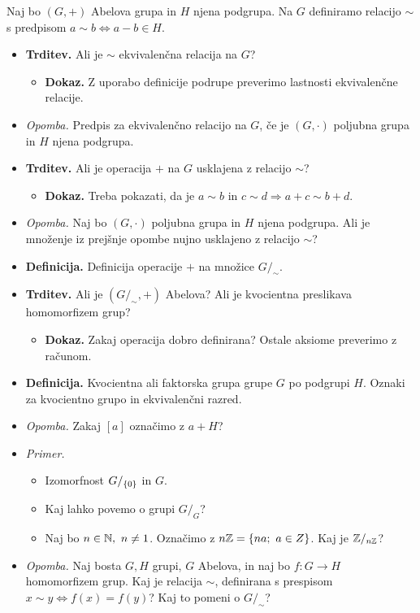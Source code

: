 \begin{enumerate}
    Naj bo $(G,+)$ Abelova grupa in $H$ njena podgrupa. Na $G$ definiramo relacijo $\sim$ s predpisom $a \sim b \Leftrightarrow a - b \in H$.
    \begin{itemize}
        \item \colorbox{blue!30}{\textbf{Trditev.}} Ali je $\sim$ ekvivalenčna relacija na $G$?
        \begin{itemize}
            \item \colorbox{green!30}{\textbf{Dokaz.}} Z uporabo definicije podrupe preverimo lastnosti ekvivalenčne relacije.
        \end{itemize}
        \item \colorbox{yellow!30}{\emph{Opomba.}} Predpis za ekvivalenčno relacijo na $G$, če je $(G, \cdot)$ poljubna grupa in $H$ njena podgrupa.  
        \item \colorbox{blue!30}{\textbf{Trditev.}} Ali je operacija $+$ na $G$ usklajena z relacijo $\sim$?
        \begin{itemize}
            \item \colorbox{green!30}{\textbf{Dokaz.}} Treba pokazati, da je $a \sim b \text{ in } c \sim d \Rightarrow a + c \sim b + d$.
        \end{itemize}
        \item \colorbox{yellow!30}{\emph{Opomba.}} Naj bo $(G, \cdot)$ poljubna grupa in $H$ njena podgrupa. Ali je množenje iz prejšnje opombe nujno usklajeno z relacijo $\sim$?
        \item \colorbox{purple!30}{\textbf{Definicija.}} Definicija operacije $+$ na množice $G/_\sim$.
        \item \colorbox{blue!30}{\textbf{Trditev.}} Ali je $(G/_\sim, +)$ Abelova? Ali je kvocientna preslikava homomorfizem grup?
        \begin{itemize}
            \item \colorbox{green!30}{\textbf{Dokaz.}} Zakaj operacija dobro definirana? Ostale aksiome preverimo z računom.
        \end{itemize}
        \item \colorbox{purple!30}{\textbf{Definicija.}} Kvocientna ali faktorska grupa grupe $G$ po podgrupi $H$. Oznaki za kvocientno grupo in ekvivalenčni razred.
        \item \colorbox{yellow!30}{\emph{Opomba.}} Zakaj $[a]$ označimo z $a+H$?
        \item \colorbox{yellow!30}{\emph{Primer.}}
        \begin{itemize}
            \item Izomorfnost $G/_{\left\{0\right\}}$ in $G$.
            \item Kaj lahko povemo o grupi $G/_G$?
            \item Naj bo $n \in \mathbb{N}, \ n \neq 1$. Označimo z $n\mathbb{Z} = \left\{na; \ a \in Z\right\}$. Kaj je $\mathbb{Z}/_{n\mathbb{Z}}$?
        \end{itemize}
        \item \colorbox{yellow!30}{\emph{Opomba.}} Naj bosta $G, H$ grupi, $G$ Abelova, in naj bo $f: G \to H$ homomorfizem grup. Kaj je relacija $\sim$, definirana s prespisom $x \sim y \Leftrightarrow f(x) = f(y)$? Kaj to pomeni o $G/_\sim$?
        

\end{itemize}
\end{enumerate}
